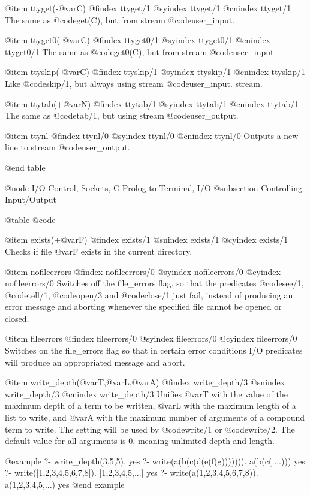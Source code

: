 {{{{{{@item ttyget(-@var{C})
@findex ttyget/1
@syindex ttyget/1
@cnindex ttyget/1
The same as @code{get(C)}, but from stream @code{user_input}.

@item ttyget0(-@var{C})
@findex ttyget0/1
@syindex ttyget0/1
@cnindex ttyget0/1
The same as @code{get0(C)}, but from stream @code{user_input}.

@item ttyskip(-@var{C})
@findex ttyskip/1
@syindex ttyskip/1
@cnindex ttyskip/1
Like @code{skip/1}, but always using stream @code{user_input}.
stream.

@item ttytab(+@var{N})
@findex ttytab/1
@syindex ttytab/1
@cnindex ttytab/1
The same as @code{tab/1}, but using stream @code{user_output}.

@item ttynl
@findex ttynl/0
@syindex ttynl/0
@cnindex ttynl/0
Outputs a new line to stream @code{user_output}.

@end table

@node I/O Control, Sockets, C-Prolog to Terminal, I/O
@subsection Controlling Input/Output

@table @code

@item exists(+@var{F})
@findex exists/1
@snindex exists/1
@cyindex exists/1
Checks if file @var{F} exists in the current directory.

@item nofileerrors
@findex nofileerrors/0
@syindex nofileerrors/0
@cyindex nofileerrors/0
Switches off the file_errors flag, so that the predicates @code{see/1},
@code{tell/1}, @code{open/3} and @code{close/1} just fail, instead of producing
an error message and aborting whenever the specified file cannot be
opened or closed.

@item fileerrors
@findex fileerrors/0
@syindex fileerrors/0
@cyindex fileerrors/0
Switches on the file_errors flag so that in certain error conditions
I/O predicates will produce an appropriated message and abort.

@item write_depth(@var{T},@var{L},@var{A})
@findex write_depth/3
@snindex write_depth/3
@cnindex write_depth/3
Unifies @var{T} with the value of the maximum depth of a term to be
written, @var{L} with the maximum length of a list to write, and @var{A}
with the maximum number of arguments of a compound term to write. The
setting will be used by @code{write/1} or @code{write/2}. The default
value for all arguments is 0, meaning unlimited depth and length.

@example
?- write_depth(3,5,5).
yes
?- write(a(b(c(d(e(f(g))))))).
a(b(c(....)))
yes
?- write([1,2,3,4,5,6,7,8]).
[1,2,3,4,5,...]
yes
?- write(a(1,2,3,4,5,6,7,8)).
a(1,2,3,4,5,...)
yes
@end example

}}}}}}
